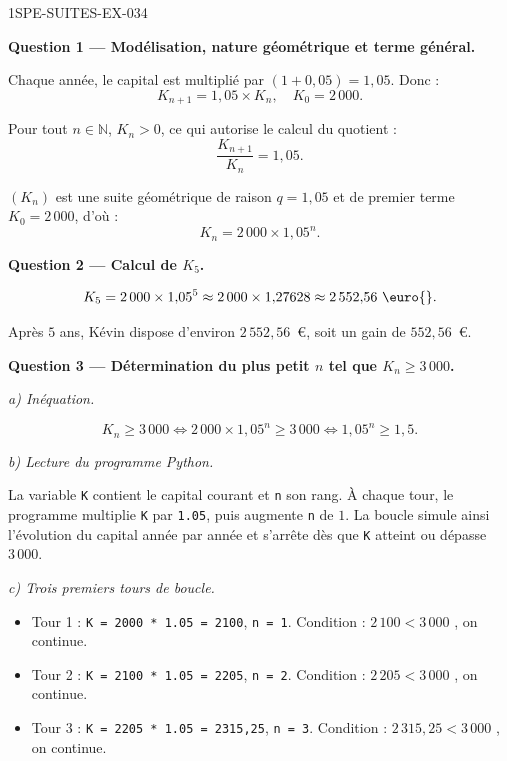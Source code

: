 \begin{corrige}{1SPE-SUITES-EX-034}

\textbf{Question 1 — Modélisation, nature géométrique et terme général.}

Chaque année, le capital est multiplié par $(1 + 0{,}05) = 1{,}05$. Donc :
\[
  K_{n+1} = 1{,}05 \times K_n, \quad K_0 = 2\,000.
\]

Pour tout $n \in \mathbb{N}$, $K_n > 0$, ce qui autorise le calcul du quotient :
\[
  \frac{K_{n+1}}{K_n} = 1{,}05.
\]


$(K_n)$ est une suite géométrique de raison $q = 1{,}05$ et de premier terme $K_0 = 2\,000$, d'où :
\[
  K_n = 2\,000 \times 1{,}05^n.
\]

\medskip
\textbf{Question 2 — Calcul de $K_5$.}

\[
  K_5 = 2\,000 \times 1{,}05^5 \approx 2\,000 \times 1{,}27628 \approx 2\,552{,}56 \text{ \euro{}}.
\]

Après $5$ ans, Kévin dispose d'environ $2\,552{,}56$~\euro{}, soit un gain de $552{,}56$~\euro{}.

\medskip
\textbf{Question 3 — Détermination du plus petit $n$ tel que $K_n \geq 3\,000$.}

\textit{a) Inéquation.}

\[
  K_n \geq 3\,000 \iff 2\,000 \times 1{,}05^n \geq 3\,000 \iff 1{,}05^n \geq 1{,}5.
\]

\textit{b) Lecture du programme Python.}


La variable \texttt{K} contient le capital courant et \texttt{n} son rang. À chaque tour, le programme multiplie \texttt{K} par \texttt{1.05}, puis augmente \texttt{n} de $1$. La boucle simule ainsi l'évolution du capital année par année et s'arrête dès que \texttt{K} atteint ou dépasse $3\,000$.

\textit{c) Trois premiers tours de boucle.}

\begin{itemize}
  \item Tour 1 : \texttt{K = 2000 * 1.05 = 2100}, \texttt{n = 1}. Condition : $2\,100 < 3\,000$ \checkmark, on continue.
  \item Tour 2 : \texttt{K = 2100 * 1.05 = 2205}, \texttt{n = 2}. Condition : $2\,205 < 3\,000$ \checkmark, on continue.
  \item Tour 3 : \texttt{K = 2205 * 1.05 = 2315,25}, \texttt{n = 3}. Condition : $2\,315{,}25 < 3\,000$ \checkmark, on continue.
\end{itemize}


\end{corrige}
